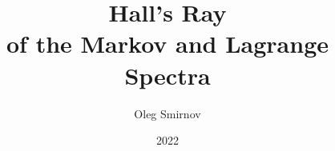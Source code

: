 \documentclass[aspectratio=1610]{beamer}
\title[Hall's Ray]{Hall's Ray\\of the Markov and Lagrange Spectra}
\author{Oleg Smirnov}
\institute{Higher School of Economics}
\date{2022}
\begin{document}
\frame{\titlepage}









\end{document}
